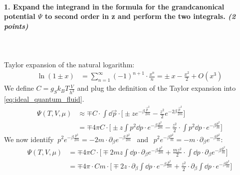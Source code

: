 \paragraph{1. Expand the integrand in the formula for the 
    grandcanonical potential $\Psi$ to second order in z 
    and perform the two integrals. \textit{(2 points)}
} \ \\
    \\
    Taylor expansion of the natural logarithm:
    \begin{align}
        \ln(1\pm x)
        &=\sum_{n=1}^\infty(-1)^{n+1}\cdot\frac{x^n}{n}
        =\pm\ x-\frac{x^2}{2}+O(x^3) 
    \end{align}
    We define $C=g_Sk_BT\frac{V}{h^3}$ and plug the 
    definition of the Taylor expansion into 
    \autoref{eq:ideal_quantum_fluid}.
    \begin{align}
        \Psi(T,V,\mu)
        &\approx\mp C\cdot
        \int\dd\vec p\cdot\bigg[
            \pm ze^{-\beta\frac{\vec p^2}{2m}}
            -\frac{z^2}{2}e^{-2\beta\frac{\vec p^2}{2m}}
        \bigg] \\
        &=\mp 4\pi C\cdot\bigg[
            \pm z\int p^2\dd p\cdot
                e^{-\beta\frac{p^2}{2m}}
            -\frac{z^2}{2}\cdot\int p^2\dd p\cdot
                e^{-\beta\frac{p^2}{m}}
        \bigg]
    \end{align}
    We now identify $\ p^2e^{-\beta\frac{p^2}{2m}}
    =-2m\cdot\partial_\beta e^{-\beta\frac{p^2}{2m}}\ \ $
    and $\ \ p^2e^{-\beta\frac{p^2}{m}}
    =-m\cdot\partial_\beta e^{-\beta\frac{p^2}{m}}$:
    \begin{align}
        \Psi(T,V,\mu)
        &=\mp 4\pi C\cdot\bigg[
            \mp2mz\int \dd p\cdot\partial_\beta
                e^{-\beta\frac{p^2}{2m}}
            +\frac{mz^2}{2}\cdot\int \dd p\cdot\partial_\beta
                e^{-\beta\frac{p^2}{m}}
        \bigg] \\
        &=\mp 4\pi\cdot Cm\cdot\bigg[
            \mp2z\cdot\partial_\beta\int \dd p\cdot
                e^{-\beta\frac{p^2}{2m}}
            +\frac{z^2}{2}\cdot\partial_\beta\int \dd p\cdot
                e^{-\beta\frac{p^2}{m}}
        \bigg]
    \end{align}
